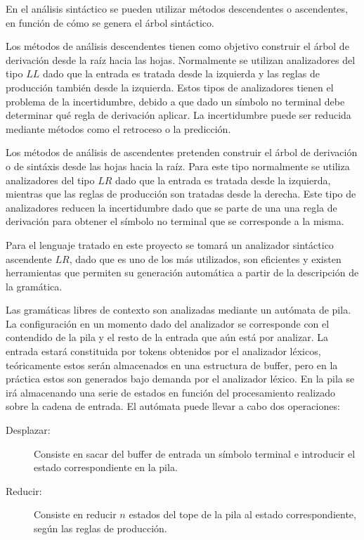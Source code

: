 En el análisis sintáctico se pueden utilizar métodos descendentes o ascendentes, en función de cómo se genera el árbol sintáctico. 

Los métodos de análisis descendentes tienen como objetivo construir el árbol de derivación desde la raíz hacia las hojas. Normalmente se
utilizan analizadores del tipo $LL$ dado que la entrada es tratada desde la izquierda y las reglas de producción también desde la izquierda.
Estos tipos de analizadores tienen el problema de la incertidumbre, debido a que dado un símbolo no terminal debe determinar qué regla de derivación aplicar. 
La incertidumbre puede ser reducida mediante métodos como el retroceso o la predicción.
 
Los métodos de análisis de ascendentes pretenden construir el árbol de derivación o de sintáxis desde las hojas hacia la raíz. Para este tipo normalmente se utiliza 
analizadores del tipo $LR$ dado que la entrada es tratada desde la izquierda, mientras que las reglas de producción son tratadas desde la derecha. Este tipo de
analizadores reducen la incertidumbre dado que se parte de una una regla de derivación para obtener el símbolo no terminal que se corresponde a la misma. 

Para el lenguaje tratado en este proyecto se tomará un analizador sintáctico ascendente $LR$, dado que es uno de los más utilizados, son eficientes y 
existen herramientas que permiten su generación automática a partir de la descripción de la gramática. 

Las gramáticas libres de contexto son analizadas mediante un autómata de pila. La configuración en un momento dado del analizador se corresponde con el contendido de la pila y el resto de la 
entrada que aún está por analizar. La entrada estará constituida por tokens obtenidos por el analizador léxicos, teóricamente estos serán almacenados en una estructura de buffer, pero 
en la práctica estos son generados bajo demanda por el analizador léxico. En la pila se irá almacenando una serie de estados en función del procesamiento realizado sobre la cadena de entrada. 
El autómata puede llevar a cabo dos operaciones:

\begin{description}
\item[Desplazar:] Consiste en sacar del buffer de entrada un símbolo terminal e introducir el estado correspondiente en la pila.
\item[Reducir:] Consiste en reducir $n$ estados del tope de la pila al estado correspondiente, según las reglas de producción.
\end{description}

